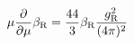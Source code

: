 \begin{equation}
\mu\frac{\partial}{\partial\mu} \beta_{\rm R}
 =\frac{44}3 \beta_{\rm R}\frac{g_{\rm R}^2}{(4\pi)^2} 
\label{MAbeta}
\end{equation}

